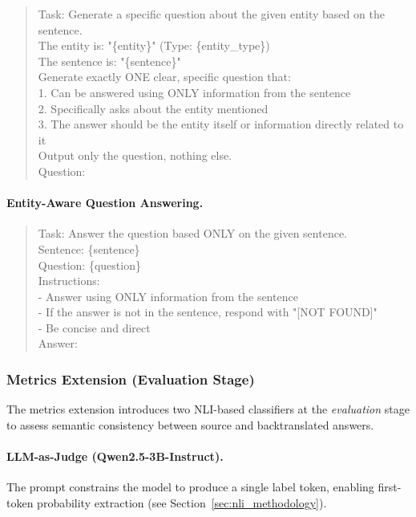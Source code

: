 \begin{quote}
\small\ttfamily
Task: Generate a specific question about the given entity based on the sentence.\\[4pt]
The entity is: "\{entity\}" (Type: \{entity\_type\})\\
The sentence is: "\{sentence\}"\\[4pt]
Generate exactly ONE clear, specific question that:\\
1. Can be answered using ONLY information from the sentence\\
2. Specifically asks about the entity mentioned\\
3. The answer should be the entity itself or information directly related to it\\[4pt]
Output only the question, nothing else.\\[4pt]
Question:
\end{quote}

\paragraph{Entity-Aware Question Answering.}

\begin{quote}
\small\ttfamily
Task: Answer the question based ONLY on the given sentence.\\[4pt]
Sentence: \{sentence\}\\
Question: \{question\}\\[4pt]
Instructions:\\
- Answer using ONLY information from the sentence\\
- If the answer is not in the sentence, respond with "[NOT FOUND]"\\
- Be concise and direct\\[4pt]
Answer:
\end{quote}



\subsubsection{Metrics Extension (Evaluation Stage)}
\label{sec:prompts_metrics}

The metrics extension introduces two NLI-based classifiers at the \textit{evaluation} stage to assess semantic consistency between source and backtranslated answers.

\paragraph{LLM-as-Judge (Qwen2.5-3B-Instruct).}
The prompt constrains the model to produce a single label token, enabling first-token probability extraction (see Section~\ref{sec:nli_methodology}).

